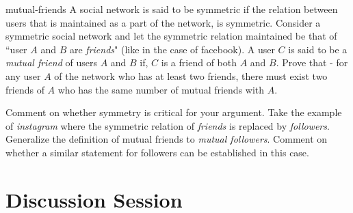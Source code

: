 \begin{exercise-prob}
\begin{show-ps1}{mutual-friends}
A social network is said to be symmetric if the relation between users that is maintained as a part of the network, is symmetric. Consider a symmetric social network  and let the symmetric relation maintained be that of ``user $A$ and $B$ are {\em friends}" (like in the case of facebook). A user $C$ is said to be a \textit{mutual friend} of users $A$ and $B$ if, $C$ is a friend of both $A$ and $B$. Prove that - for any user $A$ of the network who has at least two friends, there must exist two friends of $A$ who has the same number of mutual friends with $A$. 

Comment on whether symmetry is critical for your argument. Take the example of {\em instagram} where the symmetric relation of {\em friends} is replaced by {\em followers}. Generalize the definition of mutual friends to {\em mutual followers}. Comment on whether a similar statement for followers can be established in this case.
\end{show-ps1}
\end{exercise-prob}

\section{Discussion Session}